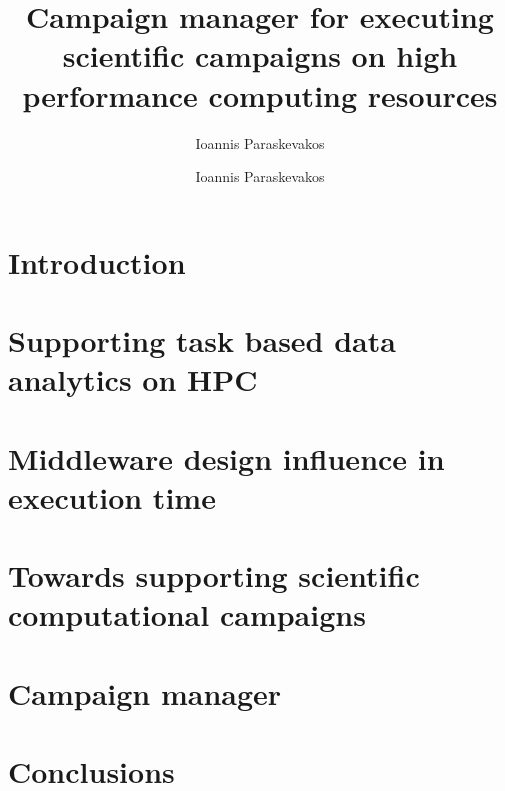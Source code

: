 \documentclass[final]{ruthesis}
\begin{document}
\author{Ioannis Paraskevakos}
\copyrightp
\title{Campaign manager for executing scientific campaigns on high performance computing resources}
\author{Ioannis Paraskevakos}					
\figurespage
\tablespage

\abstract{}
\acknowledgements{}

\beforepreface
\afterpreface

\chapter{Introduction}


\chapter{Supporting task based data analytics on HPC}


\chapter{Middleware design influence in execution time}


\chapter{Towards supporting scientific computational campaigns}

\chapter{Campaign manager}

\chapter{Conclusions}




\end{document}
